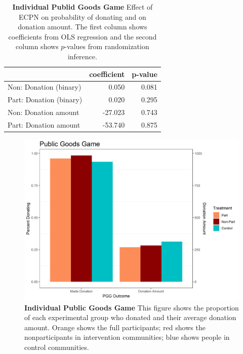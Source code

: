 \documentclass[
]{article}
\begin{document}
\begin{table}[H]
\begin{center}
\label{tab:pgg_tab_ind}
\caption{\textbf{Individual Publid Goods Game} Effect of ECPN on probability of donating and on donation amount. The first column shows coefficients from OLS regression and the second column shows $p$-values from randomization inference.}
\smallskip

\begin{tabular}{l|r|r}
\hline
  & coefficient & p-value\\
\hline
Non: Donation (binary) & 0.050 & 0.081\\
\hline
Part: Donation (binary) & 0.020 & 0.295\\
\hline
Non: Donation amount & -27.023 & 0.743\\
\hline
Part: Donation amount & -53.740 & 0.875\\
\hline
\end{tabular}


\end{center}
\end{table}

\begin{figure}[H]
\begin{center}
\includegraphics[width=.8\textwidth]{figs/pggPan_plot.png}
\caption{\label{fig:pgg_plot_ind} \textbf{Individual Public Goods Game} This figure shows the proportion of each experimental group who donated and their average donation amount. Orange shows the full participants; red shows the nonparticipants in intervention communities; blue shows people in control communities.}
\end{center}
\end{figure}
\end{document}
